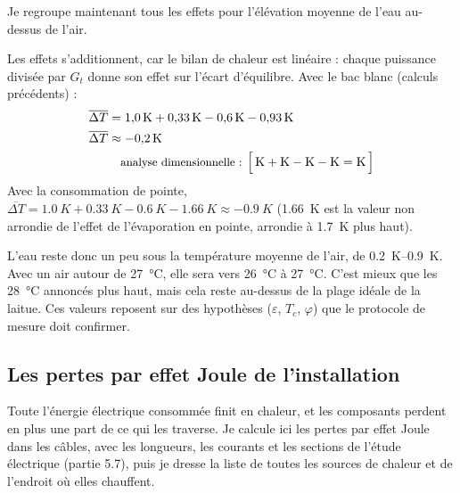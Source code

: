 Je regroupe maintenant tous les effets pour l'élévation moyenne de l'eau au-dessus de l'air.

\begin{demonstration}
Les effets s'additionnent, car le bilan de chaleur est linéaire : chaque puissance divisée par $G_t$ donne son effet sur l'écart d'équilibre. Avec le bac blanc (calculs précédents) :
\begin{align*}
\overline{\Delta T} &= \qty{1,0}{K} + \qty{0,33}{K} - \qty{0,6}{K} - \qty{0,93}{K}\\
\overline{\Delta T} &\approx \qty{-0,2}{K}\\
\dimline{\unit{K}+\unit{K}-\unit{K}-\unit{K}=\unit{K}}
\end{align*}
Avec la consommation de pointe, $\overline{\Delta T} = \qty{1,0}{K} + \qty{0,33}{K} - \qty{0,6}{K} - \qty{1,66}{K} \approx \qty{-0,9}{K}$ (\qty{1,66}{K} est la valeur non arrondie de l'effet de l'évaporation en pointe, arrondie à \qty{1,7}{K} plus haut).
\end{demonstration}

L'eau reste donc un peu sous la température moyenne de l'air, de \qtyrange{0,2}{0,9}{K}. Avec un air autour de \qty{27}{\celsius}, elle sera vers \qty{26}{\celsius} à \qty{27}{\celsius}. C'est mieux que les \qty{28}{\celsius} annoncés plus haut, mais cela reste au-dessus de la plage idéale de la laitue. Ces valeurs reposent sur des hypothèses ($\varepsilon$, $T_c$, $\varphi$) que le protocole de mesure doit confirmer.

\subsection{Les pertes par effet Joule de l'installation}

Toute l'énergie électrique consommée finit en chaleur, et les composants perdent en plus une part de ce qui les traverse. Je calcule ici les pertes par effet Joule dans les câbles, avec les longueurs, les courants et les sections de l'étude électrique (partie 5.7), puis je dresse la liste de toutes les sources de chaleur et de l'endroit où elles chauffent.

